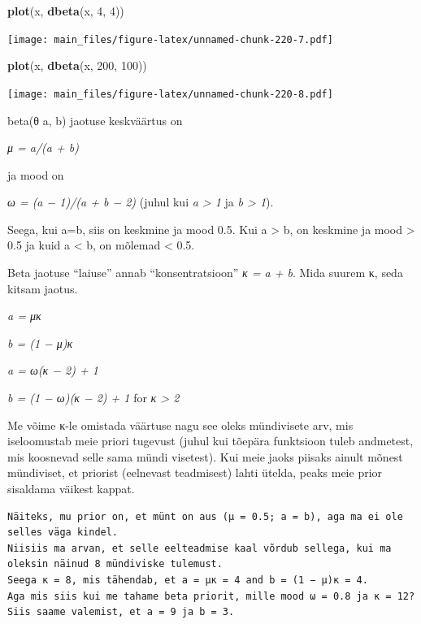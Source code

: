 \documentclass[]{book}
\newenvironment{Shaded}{\begin{snugshade}}{\end{snugshade}}
\newcommand{\KeywordTok}[1]{\textcolor[rgb]{0.13,0.29,0.53}{\textbf{#1}}}
\newcommand{\DecValTok}[1]{\textcolor[rgb]{0.00,0.00,0.81}{#1}}
\newcommand{\NormalTok}[1]{#1}
\begin{document}
\begin{Shaded}
\begin{Highlighting}[]
\KeywordTok{plot}\NormalTok{(x, }\KeywordTok{dbeta}\NormalTok{(x, }\DecValTok{4}\NormalTok{, }\DecValTok{4}\NormalTok{))}
\end{Highlighting}
\end{Shaded}

\texttt{[image: main\_files/figure-latex/unnamed-chunk-220-7.pdf]}

\begin{Shaded}
\begin{Highlighting}[]
\KeywordTok{plot}\NormalTok{(x, }\KeywordTok{dbeta}\NormalTok{(x, }\DecValTok{200}\NormalTok{, }\DecValTok{100}\NormalTok{))}
\end{Highlighting}
\end{Shaded}

\texttt{[image: main\_files/figure-latex/unnamed-chunk-220-8.pdf]}

beta(θ \textbar{} a, b) jaotuse keskväärtus on

\emph{μ = a/(a + b)}

ja mood on

\emph{ω = (a − 1)/(a + b − 2)} (juhul kui \emph{a \textgreater{} 1} ja
\emph{b \textgreater{} 1}).

Seega, kui a=b, siis on keskmine ja mood 0.5. Kui a \textgreater{} b, on
keskmine ja mood \textgreater{} 0.5 ja kuid a \textless{} b, on mõlemad
\textless{} 0.5.

Beta jaotuse ``laiuse'' annab ``konsentratsioon'' \emph{κ = a + b}. Mida
suurem κ, seda kitsam jaotus.

\emph{a = μκ}

\emph{b = (1 − μ)κ}

\emph{a = ω(κ − 2) + 1}

\emph{b = (1 − ω)(κ − 2) + 1} for \emph{κ \textgreater{} 2}

Me võime κ-le omistada väärtuse nagu see oleks mündivisete arv, mis
iseloomustab meie priori tugevust (juhul kui tõepära funktsioon tuleb
andmetest, mis koosnevad selle sama mündi visetest). Kui meie jaoks
piisaks ainult mõnest mündiviset, et priorist (eelnevast teadmisest)
lahti ütelda, peaks meie prior sisaldama väikest kappat.

\begin{verbatim}
Näiteks, mu prior on, et münt on aus (μ = 0.5; a = b), aga ma ei ole selles väga kindel. 
Niisiis ma arvan, et selle eelteadmise kaal võrdub sellega, kui ma oleksin näinud 8 mündiviske tulemust. 
Seega κ = 8, mis tähendab, et a = μκ = 4 and b = (1 − μ)κ = 4. 
Aga mis siis kui me tahame beta priorit, mille mood ω = 0.8 ja κ = 12? 
Siis saame valemist, et a = 9 ja b = 3. 
\end{verbatim}
\end{document}
